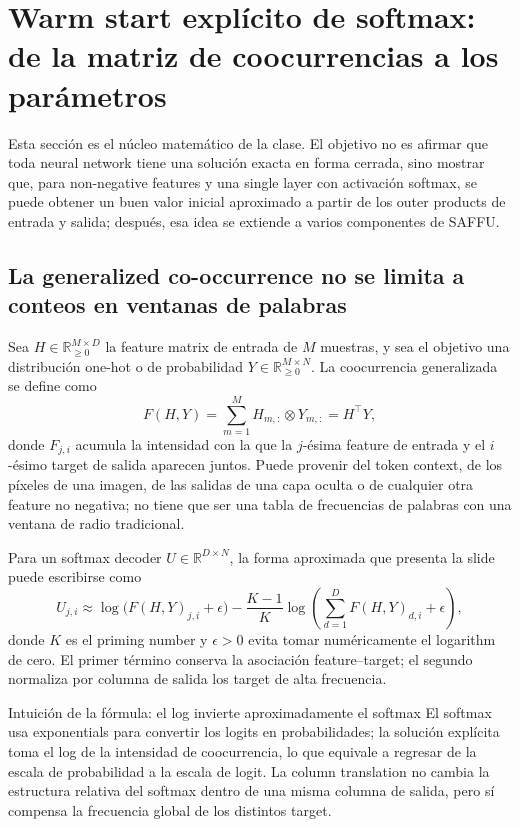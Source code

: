 \section{Warm start explícito de softmax: de la matriz de coocurrencias a los parámetros}

Esta sección es el núcleo matemático de la clase. El objetivo no es afirmar que toda neural network tiene una solución exacta en forma cerrada, sino mostrar que, para non-negative features y una single layer con activación softmax, se puede obtener un buen valor inicial aproximado a partir de los outer products de entrada y salida; después, esa idea se extiende a varios componentes de SAFFU.

\subsection{La generalized co-occurrence no se limita a conteos en ventanas de palabras}

Sea $H\in\mathbb{R}_{\ge 0}^{M\times D}$ la feature matrix de entrada de $M$ muestras, y sea el objetivo una distribución one-hot o de probabilidad $Y\in\mathbb{R}_{\ge 0}^{M\times N}$. La coocurrencia generalizada se define como
\[
F(H,Y)=\sum_{m=1}^{M}H_{m,:}\otimes Y_{m,:}=H^\top Y,
\]
donde $F_{j,i}$ acumula la intensidad con la que la $j$-ésima feature de entrada y el $i$-ésimo target de salida aparecen juntos. Puede provenir del token context, de los píxeles de una imagen, de las salidas de una capa oculta o de cualquier otra feature no negativa; no tiene que ser una tabla de frecuencias de palabras con una ventana de radio tradicional.


Para un softmax decoder $U\in\mathbb{R}^{D\times N}$, la forma aproximada que presenta la slide puede escribirse como
\[
U_{j,i}\approx \log\!\bigl(F(H,Y)_{j,i}+\epsilon\bigr)
-\frac{K-1}{K}\log\!\left(\sum_{d=1}^{D}F(H,Y)_{d,i}+\epsilon\right),
\]
donde $K$ es el priming number y $\epsilon>0$ evita tomar numéricamente el logarithm de cero. El primer término conserva la asociación feature--target; el segundo normaliza por columna de salida los target de alta frecuencia.

\begin{importantbox}{Intuición de la fórmula: el log invierte aproximadamente el softmax}
El softmax usa exponentials para convertir los logits en probabilidades; la solución explícita toma el log de la intensidad de coocurrencia, lo que equivale a regresar de la escala de probabilidad a la escala de logit. La column translation no cambia la estructura relativa del softmax dentro de una misma columna de salida, pero sí compensa la frecuencia global de los distintos target.
\end{importantbox}

